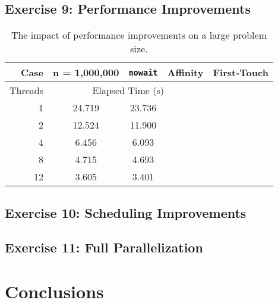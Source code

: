 \documentclass{article}
\begin{document}
\subsection{Exercise 9: Performance Improvements}

\begin{table}[h!]
	\centering
	\caption{The impact of performance improvements on a large problem size.}
	\label{tbl:speedup}
	\begin{tabular}{r|cccc}
		Case & n = 1,000,000 & \verb|nowait| & Affinity & First-Touch \\
		\hline
		Threads & \multicolumn{3}{c}{Elapsed Time (s)} \\
		\hline
		1 & 24.719 & 23.736 &  &  \\
		2 & 12.524 & 11.900 &  &  \\
		4 & 6.456 & 6.093 &  &  \\
		8 & 4.715 & 4.693 &  &  \\
		12 & 3.605 & 3.401 &  & 
	\end{tabular}
\end{table}

\subsection{Exercise 10: Scheduling Improvements}

\subsection{Exercise 11: Full Parallelization}

\section{Conclusions}
\end{document}
